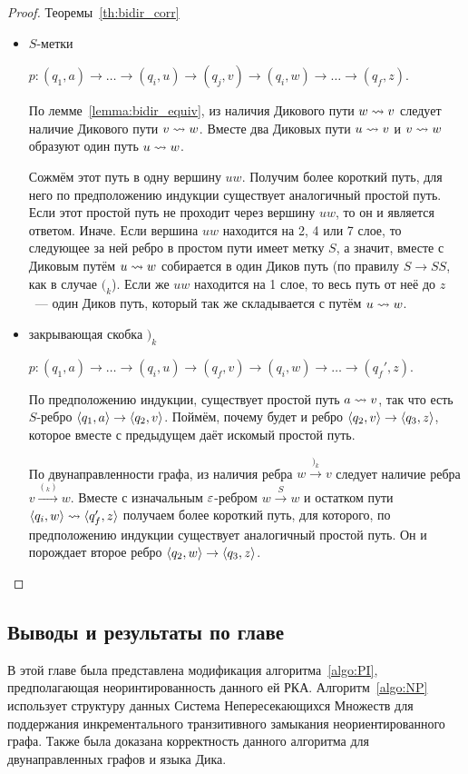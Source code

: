 \begin{proof}{Теоремы~\ref{th:bidir_corr}}
\begin{itemize}
    \item $S$-метки

      $p \colon (q_1, a) \rightarrow \dots \rightarrow (q_i, u) \rightarrow (q_j, v) \rightarrow (q_i, w) \rightarrow \dots \rightarrow (q_f, z)$.

      По лемме~\ref{lemma:bidir_equiv}, из наличия Дикового пути $w \rightsquigarrow v$ следует наличие Дикового пути $v \rightsquigarrow w$. Вместе два Диковых пути $u \rightsquigarrow v$ и $v \rightsquigarrow w$ образуют один путь $u \rightsquigarrow w$. 

      Сожмём этот путь в одну вершину $uw$. Получим более короткий путь, для него по предположению индукции существует аналогичный простой путь. Если этот простой путь не проходит через вершину $uw$, то он и является ответом. Иначе. Если вершина $uw$ находится на 2, 4 или 7 слое, то следующее за ней ребро в простом пути имеет метку $S$, а значит, вместе с Диковым путём $u \rightsquigarrow w$ собирается в один Диков путь (по правилу $S \to SS$, как в случае $(_k$). Если же $uw$ находится на 1 слое, то весь путь от неё до $z$~--- один Диков путь, который так же складывается с путём $u \rightsquigarrow w$.  

    \item закрывающая скобка $)_k$

      $p \colon (q_1, a) \rightarrow \dots \rightarrow (q_i, u) \rightarrow (q_f, v) \rightarrow (q_i, w) \rightarrow \dots \rightarrow (q_f', z)$.

      По предположению индукции, существует простой путь $a \rightsquigarrow v$, так что есть $S$-ребро $\langle q_1, a \rangle \rightarrow \langle q_2, v \rangle$. Поймём, почему будет и ребро $\langle q_2, v \rangle \rightarrow \langle q_3, z \rangle$, которое вместе с предыдущем даёт искомый простой путь.

      По двунаправленности графа, из наличия ребра $w \xrightarrow{)_k} v$ следует наличие ребра $v \xrightarrow{(_k)} w$. Вместе с изначальным $\varepsilon$-ребром $w \xrightarrow{S} w$ и остатком пути $\langle q_i, w \rangle \rightsquigarrow \langle q_f', z \rangle$ получаем более короткий путь, для которого, по предположению индукции существует аналогичный простой путь. Он и порождает второе ребро $\langle q_2, w \rangle \rightarrow \langle q_3, z \rangle$. 

  \end{itemize}

\end{proof}

\subsection{Выводы и результаты по главе}

В этой главе была представлена модификация алгоритма~\ref{algo:PI}, предполагающая неоринтированность данного ей РКА. Алгоритм~\ref{algo:NP} использует структуру данных Система Непересекающихся Множеств для поддержания инкрементального транзитивного замыкания неориентированного графа. Также была доказана корректность данного алгоритма для двунаправленных графов и языка Дика.
